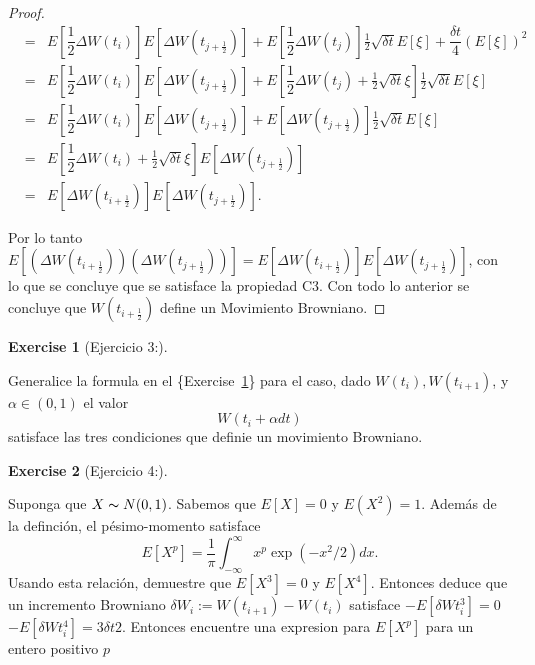 \documentclass[
  letterpaper,
  DIV=11,
  numbers=noendperiod]{scrreprt}
\theoremstyle{definition}
\newtheorem{exercise}{Exercise}[chapter]
\theoremstyle{plain}
\theoremstyle{remark}
\begin{document}
\begin{proof}
\[\begin{eqnarray*}
  & = & E\left[\dfrac{1}{2}\Delta W(t_{i})\right]E\left[\Delta W(t_{j+\frac{1}{2}})\right]+E\left[\dfrac{1}{2}\Delta W(t_{j})\right]\frac{1}{2}\sqrt{\delta t}E\left[\xi\right]+\dfrac{\delta t}{4}\left(E\left[\xi\right]\right)^{2}\\
 & = & E\left[\dfrac{1}{2}\Delta W(t_{i})\right]E\left[\Delta W(t_{j+\frac{1}{2}})\right] +E\left[\dfrac{1}{2}\Delta W(t_{j})+\frac{1}{2}\sqrt{\delta t}\xi\right]\frac{1}{2}\sqrt{\delta t}E\left[\xi\right]\\
 & = & E\left[\dfrac{1}{2}\Delta W(t_{i})\right]E\left[\Delta W(t_{j+\frac{1}{2}})\right]+E\left[\Delta W(t_{j+\frac{1}{2}})\right]\frac{1}{2}\sqrt{\delta t}E\left[\xi\right]\\
 & = & E\left[\dfrac{1}{2}\Delta W(t_{i})+\frac{1}{2}\sqrt{\delta t}\xi\right]E\left[\Delta W(t_{j+\frac{1}{2}})\right]\\
 & = & E\left[\Delta W(t_{i+\frac{1}{2}})\right]E\left[\Delta W(t_{j+\frac{1}{2}})\right].
\end{eqnarray*}
\]

Por lo tanto
\(E\left[\left(\Delta W(t_{i+\frac{1}{2}})\right)\left(\Delta W(t_{j+\frac{1}{2}})\right)\right]= E\left[\Delta W(t_{i+\frac{1}{2}})\right]E\left[\Delta W(t_{j+\frac{1}{2}})\right]\),
con lo que se concluye que se satisface la propiedad C3. Con todo lo
anterior se concluye que \(W(t_{i+\frac{1}{2}})\) define un Movimiento
Browniano.

\end{proof}

\begin{exercise}[Ejercicio 3:]\protect\hypertarget{exr-3}{}\label{exr-3}

Generalice la formula en el \{Exercise~\ref{exr-3}\} para el caso, dado
\(W(t_{i}), W(t_{i+1})\), y \(\alpha\in(0,1)\) el valor \[
W(t_{i}+\alpha dt)
\] satisface las tres condiciones que definie un movimiento Browniano.

\end{exercise}

\begin{exercise}[Ejercicio 4:]\protect\hypertarget{exr-4}{}\label{exr-4}

Suponga que \(X\thicksim N(0,1)\). Sabemos que \(E[X]=0\) y
\(E(X^{2})=1\). Además de la definción, el pésimo-momento satisface \[
E[X^{p}]=\frac{1}{\pi}\int_{-\infty}^{\infty}x^{p}\exp(-x^{2}/2)dx.
\] Usando esta relación, demuestre que \(E[X^{3}]=0\) y \(E[X^{4}]\).
Entonces deduce que un incremento Browniano
\(\delta W_{i}:=W(t_{i+1})-W(t_{i})\) satisface
\(-E[\delta Wt_{i}^{3}]=0\) \(-E[\delta Wt_{i}^{4}]=3\delta t{2}\).
Entonces encuentre una expresion para \(E[X^{p}]\) para un entero
positivo \(p\)

\end{exercise}
\end{document}
